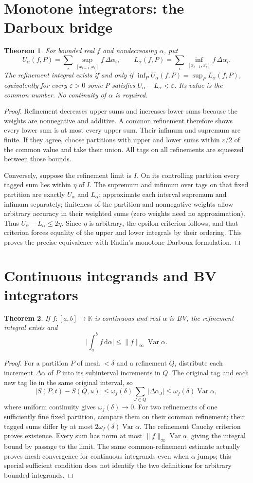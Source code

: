 \documentclass[11pt,oneside,a4paper]{book}
\newtheorem{theorem}{Theorem}[chapter]
\theoremstyle{definition}
\theoremstyle{remark}
\newcommand{\K}{\mathbb K}
\newcommand{\eps}{\varepsilon}
\newcommand{\abs}[1]{\lvert#1\rvert}
\newcommand{\norm}[1]{\lVert#1\rVert}
\newcommand{\dd}{\,\mathrm d}
\DeclareMathOperator{\Var}{Var}
\newcommand{\KEntry}[2]{\Needspace{7\baselineskip}\section{#2}\label{#1}{\small\sffamily\color{black!60}\detokenize{#1}}\par}
\begin{document}
\KEntry{K03.15.rs_darboux}{Monotone integrators: the Darboux bridge}
\begin{theorem}
For bounded real $f$ and nondecreasing $\alpha$, put
\[U_\alpha(f,P)=\sum_i\sup_{[x_{i-1},x_i]}f\,\Delta\alpha_i,\qquad
L_\alpha(f,P)=\sum_i\inf_{[x_{i-1},x_i]}f\,\Delta\alpha_i.\]
The refinement integral exists if and only if $\inf_P U_\alpha(f,P)=\sup_P L_\alpha(f,P)$, equivalently for every $\eps>0$ some $P$ satisfies $U_\alpha-L_\alpha<\eps$. Its value is the common number. No continuity of $\alpha$ is required.
\end{theorem}
\begin{proof}
Refinement decreases upper sums and increases lower sums because the weights are nonnegative and additive. A common refinement therefore shows every lower sum is at most every upper sum. Their infimum and supremum are finite. If they agree, choose partitions with upper and lower sums within $\eps/2$ of the common value and take their union. All tags on all refinements are squeezed between those bounds.

Conversely, suppose the refinement limit is $I$. On its controlling partition every tagged sum lies within $\eta$ of $I$. The supremum and infimum over tags on that fixed partition are exactly $U_\alpha$ and $L_\alpha$: approximate each interval supremum and infimum separately; finiteness of the partition and nonnegative weights allow arbitrary accuracy in their weighted sums (zero weights need no approximation). Thus $U_\alpha-L_\alpha\leq2\eta$. Since $\eta$ is arbitrary, the epsilon criterion follows, and that criterion forces equality of the upper and lower integrals by their ordering. This proves the precise equivalence with Rudin's monotone Darboux formulation.
\end{proof}

\KEntry{K03.15.rs_existence}{Continuous integrands and BV integrators}
\begin{theorem}
If $f:[a,b]\to\K$ is continuous and real $\alpha$ is BV, the refinement integral exists and
\[\abs{\int_a^b f\dd\alpha}\leq\norm f_\infty\Var\alpha.\]
\end{theorem}
\begin{proof}
For a partition $P$ of mesh $<\delta$ and a refinement $Q$, distribute each increment $\Delta\alpha$ of $P$ into its subinterval increments in $Q$. The original tag and each new tag lie in the same original interval, so
\[\abs{S(P,t)-S(Q,u)}\leq\omega_f(\delta)\sum_{J\in Q}\abs{\Delta\alpha_J}\leq\omega_f(\delta)\Var\alpha,\]
where uniform continuity gives $\omega_f(\delta)\to0$. For two refinements of one sufficiently fine fixed partition, compare them on their common refinement; their tagged sums differ by at most $2\omega_f(\delta)\Var\alpha$. The refinement Cauchy criterion proves existence. Every sum has norm at most $\norm f_\infty\Var\alpha$, giving the integral bound by passage to the limit. The same common-refinement estimate actually proves mesh convergence for continuous integrands even when $\alpha$ jumps; this special sufficient condition does not identify the two definitions for arbitrary bounded integrands.
\end{proof}
\end{document}
